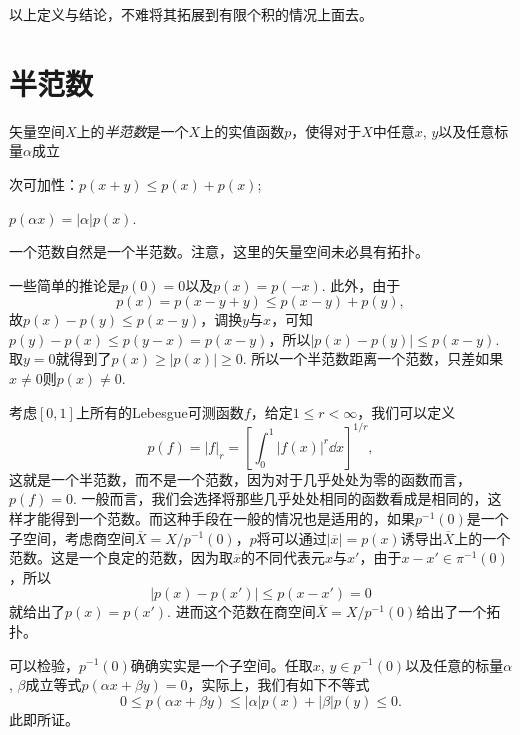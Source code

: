 以上定义与结论，不难将其拓展到有限个积的情况上面去。

\section{半范数}

\begin{para}[半范数]
矢量空间$X$上的\textit{半范数}是一个$X$上的实值函数$p$，使得对于$X$中任意$x$, $y$以及任意标量$\alpha$成立
\begin{compactenum}
\item 次可加性：$p(x+y)\leq p(x)+p(x)$;
\item $p(\alpha x)=|\alpha|p(x)$.
\end{compactenum}
一个范数自然是一个半范数。注意，这里的矢量空间未必具有拓扑。

一些简单的推论是$p(0)=0$以及$p(x)=p(-x)$. 此外，由于
\[
	p(x)=p(x-y+y)\leq p(x-y)+p(y),
\]
故$p(x)-p(y)\leq p(x-y)$，调换$y$与$x$，可知$p(y)-p(x)\leq p(y-x)=p(x-y)$，所以$|p(x)-p(y)|\leq p(x-y)$. 取$y=0$就得到了$p(x)\geq |p(x)|\geq 0$. 所以一个半范数距离一个范数，只差如果$x\neq 0$则$p(x)\neq 0$.

考虑$[0,1]$上所有的Lebesgue可测函数$f$，给定$1\leq r<\infty$，我们可以定义
\[
	p(f)=|f|_r=\left[\int_{0}^{1}|f(x)|^r\dd x\right]^{1/r},
\]
这就是一个半范数，而不是一个范数，因为对于几乎处处为零的函数而言，$p(f)=0$. 一般而言，我们会选择将那些几乎处处相同的函数看成是相同的，这样才能得到一个范数。而这种手段在一般的情况也是适用的，如果$p^{-1}(0)$是一个子空间，考虑商空间$\overline{X}=X/p^{-1}(0)$，$p$将可以通过$|\overline{x}|=p(x)$诱导出$\overline{X}$上的一个范数。这是一个良定的范数，因为取$\overline{x}$的不同代表元$x$与$x'$，由于$x-x'\in \pi^{-1}(0)$，所以
\[
	|p(x)-p(x')|\leq p(x-x')=0
\]
就给出了$p(x)=p(x')$. 进而这个范数在商空间$\overline{X}=X/p^{-1}(0)$给出了一个拓扑。

可以检验，$p^{-1}(0)$确确实实是一个子空间。任取$x$, $y\in p^{-1}(0)$以及任意的标量$\alpha$, $\beta$成立等式$p(\alpha x+\beta y)=0$，实际上，我们有如下不等式
\[
	0\leq p(\alpha x+\beta y)\leq |\alpha|p(x)+|\beta|p(y)\leq 0.
\]
此即所证。
\end{para}




